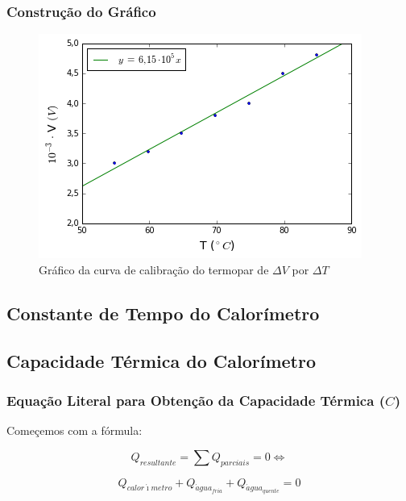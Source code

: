 \documentclass[a4paper]{article}
\begin{document}
		\subsubsection{Construção do Gráfico}

			\begin{figure}
				\caption{Gráfico da curva de calibração do termopar de $\Delta V$ por $\Delta T$}
					\begin{centering}
						\includegraphics[scale=0.5]{exp06a-parte1.png}
					\par\end{centering}
			\end{figure}

	\subsection{Constante de Tempo do Calorímetro}

	\subsection{Capacidade Térmica do Calorímetro}


		\subsubsection{Equação Literal para Obtenção da Capacidade Térmica ($C$)}

			Começemos com a fórmula:

			$$Q_{resultante}={\displaystyle \sum Q_{parciais}=0}\Leftrightarrow$$


			\begin{equation}
				Q_{calor\acute{\imath}metro}+Q_{\acute{a}gua_{fria}}+Q_{\acute{a}gua_{quente}}=0
			\end{equation}
\end{document}
